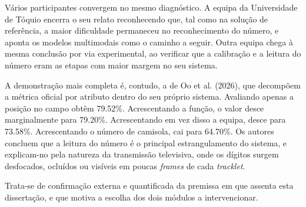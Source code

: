 Vários participantes convergem no mesmo diagnóstico. A equipa da Universidade de Tóquio encerra
o seu relato reconhecendo que, tal como na solução de referência, a maior dificuldade permaneceu
no reconhecimento do número, e aponta os modelos multimodais como o caminho a seguir. Outra
equipa chega à mesma conclusão por via experimental, ao verificar que a calibração e a leitura do
número eram as etapas com maior margem no seu sistema.

A demonstração mais completa é, contudo, a de Oo et al. (2026), que decompõem a métrica oficial
por atributo dentro do seu próprio sistema. Avaliando apenas a posição no campo obtêm 79.52\%.
Acrescentando a função, o valor desce marginalmente para 79.20\%. Acrescentando em vez disso a
equipa, desce para 73.58\%. Acrescentando o número de camisola, cai para 64.70\%. Os autores
concluem que a leitura do número é o principal estrangulamento do sistema, e explicam-no pela
natureza da transmissão televisiva, onde os dígitos surgem desfocados, ocluídos ou visíveis em
poucas \emph{frames} de cada \emph{tracklet}.

Trata-se de confirmação externa e quantificada da premissa em que assenta esta dissertação, e que
motiva a escolha dos dois módulos a intervencionar.
